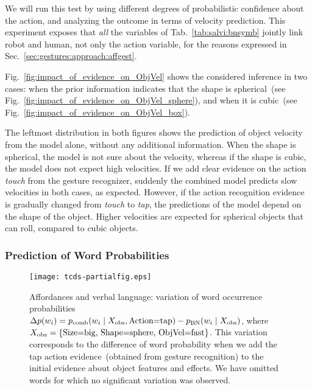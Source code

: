 We will run this test by using different degrees of probabilistic confidence about the action, and analyzing the outcome in terms of velocity prediction.
This experiment exposes that \emph{all} the variables of Tab.~\ref{tab:salvi:bnsymb} jointly link robot and human, not only the action variable, for the reasons expressed in Sec.~\ref{sec:gestures:approach:affgest}.

Fig.~\ref{fig:impact_of_evidence_on_ObjVel} shows the considered inference in two cases: when the prior information indicates that the shape is spherical~(see Fig.~\ref{fig:impact_of_evidence_on_ObjVel_sphere}), and when it is cubic~(see Fig.~\ref{fig:impact_of_evidence_on_ObjVel_box}).

The leftmost distribution in both figures shows the prediction of object velocity from the \AffWords{} model alone, without any additional information.
When the shape is spherical, the model is not sure about the velocity, whereas if the shape is cubic, the model does not expect high velocities.
If we add clear evidence on the action \emph{touch} from the gesture recognizer, suddenly the combined model predicts slow velocities in both cases, as expected.
However, if the action recognition evidence is gradually changed from \emph{touch} to \emph{tap}, the predictions of the model depend on the shape of the object.
Higher velocities are expected for spherical objects that can roll, compared to cubic objects.

\subsubsection{Prediction of Word Probabilities}
\label{sec:gestures:results:affgest:prediction_words}

\begin{figure}
\centering
\texttt{[image: tcds-partialfig.eps]}
\caption[Affordances and verbal language: variation of word occurrence probabilities.]{Affordances and verbal language: variation of word occurrence probabilities
$\Delta p(w_i) = p_\text{comb}(w_i \mid X_\text{obs}, \text{Action=tap}) - p_{\text{BN}}(w_i \mid X_\text{obs})$, where $X_\text{obs} = \{ \text{Size=big, Shape=sphere, ObjVel=fast} \}$.
This variation corresponds to the difference of word probability when we add the tap action evidence~(obtained from gesture recognition) to the initial evidence about object features and effects. We have omitted words for which no significant variation was observed.}
\label{fig:variation_word_occurrence_prob}
\end{figure}

